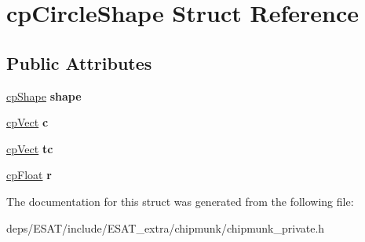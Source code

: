 \hypertarget{structcp_circle_shape}{}\section{cp\+Circle\+Shape Struct Reference}
\label{structcp_circle_shape}
\subsection*{Public Attributes}
\begin{DoxyCompactItemize}
\item 
\mbox{\label{structcp_circle_shape_a36cd91d5e626457fee162f22aa6c3acc}} 
\mbox{\hyperlink{structcp_shape}{cp\+Shape}} {\bfseries shape}
\item 
\mbox{\label{structcp_circle_shape_a7e8afd3b3517b245e32e52ec34591820}} 
\mbox{\hyperlink{structcp_vect}{cp\+Vect}} {\bfseries c}
\item 
\mbox{\label{structcp_circle_shape_acff09931d945f2af021449c232f51f35}} 
\mbox{\hyperlink{structcp_vect}{cp\+Vect}} {\bfseries tc}
\item 
\mbox{\label{structcp_circle_shape_a54e5d26ce462ecc786ac5ab411ebcebd}} 
\mbox{\hyperlink{group__basic_types_gac1ed65573e035bf892505768c852d8d3}{cp\+Float}} {\bfseries r}
\end{DoxyCompactItemize}


The documentation for this struct was generated from the following file\+:\begin{DoxyCompactItemize}
\item 
deps/\+E\+S\+A\+T/include/\+E\+S\+A\+T\+\_\+extra/chipmunk/chipmunk\+\_\+private.\+h\end{DoxyCompactItemize}
